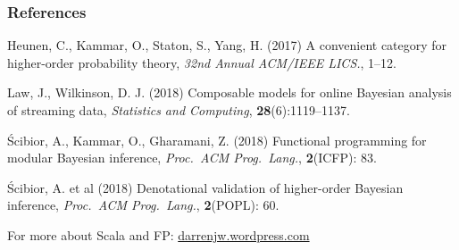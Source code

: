 \documentclass[mathserif,handout]{beamer}
\begin{document}
\begin{frame}
  \frametitle{References}
  \begin{thebibliography}{}



  \bibitem{} Heunen, C., Kammar, O., Staton, S., Yang, H. (2017) \alert{A convenient category for higher-order probability theory}, \emph{32nd Annual ACM/IEEE LICS.}, 1--12.
     
    \bibitem{} Law, J., Wilkinson, D. J. (2018) \alert{Composable models for online Bayesian analysis of streaming data}, \emph{Statistics and Computing}, \textbf{28}(6):1119--1137.
    



\bibitem{} \'{S}cibior, A., Kammar, O., Gharamani, Z. (2018) \alert{Functional programming for modular Bayesian inference}, \emph{Proc.\ ACM Prog.\ Lang.}, \textbf{2}(ICFP): 83.
      
   \'{S}cibior, A. et al (2018) \alert{Denotational validation of higher-order Bayesian inference}, \emph{Proc.\ ACM Prog.\ Lang.}, \textbf{2}(POPL): 60.
    
    
%
    
  \end{thebibliography}

  \vspace*{0.8ex}
  
For more about Scala and FP: \alert{\url{darrenjw.wordpress.com}}

\end{frame}
\end{document}
